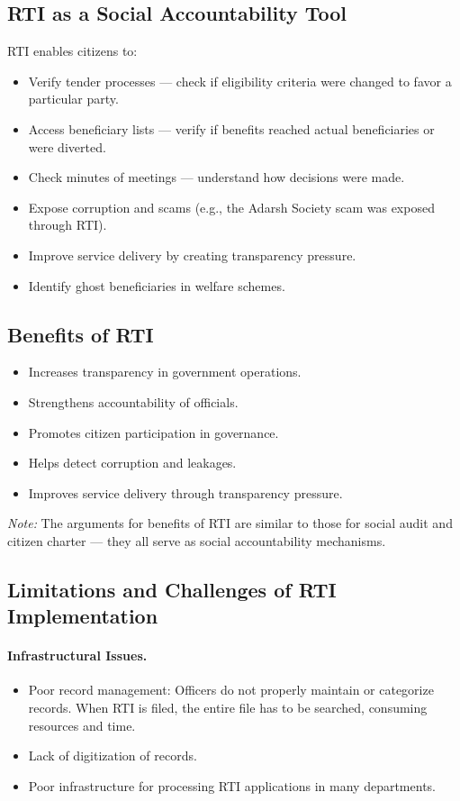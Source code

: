 \subsection{RTI as a Social Accountability Tool}
RTI enables citizens to:
\begin{itemize}
\item Verify tender processes --- check if eligibility criteria were changed to favor a particular party.
\item Access beneficiary lists --- verify if benefits reached actual beneficiaries or were diverted.
\item Check minutes of meetings --- understand how decisions were made.
\item Expose corruption and scams (e.g., the Adarsh Society scam was exposed through RTI).
\item Improve service delivery by creating transparency pressure.
\item Identify ghost beneficiaries in welfare schemes.
\end{itemize}

\subsection{Benefits of RTI}
\begin{itemize}
\item Increases transparency in government operations.
\item Strengthens accountability of officials.
\item Promotes citizen participation in governance.
\item Helps detect corruption and leakages.
\item Improves service delivery through transparency pressure.
\end{itemize}
\textit{Note:} The arguments for benefits of RTI are similar to those for social audit and citizen charter --- they all serve as social accountability mechanisms.

\subsection{Limitations and Challenges of RTI Implementation}

\paragraph{Infrastructural Issues.}
\begin{itemize}
\item Poor record management: Officers do not properly maintain or categorize records. When RTI is filed, the entire file has to be searched, consuming resources and time.
\item Lack of digitization of records.
\item Poor infrastructure for processing RTI applications in many departments.
\end{itemize}

